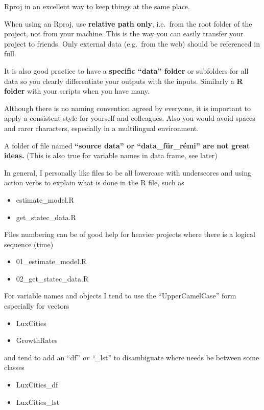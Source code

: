 \documentclass[
  letterpaper,
  DIV=11,
  numbers=noendperiod]{scrreprt}
\providecommand{\tightlist}{%
  \setlength{\itemsep}{0pt}\setlength{\parskip}{0pt}}\usepackage{longtable,booktabs,array}
\begin{document}
Rproj in an excellent way to keep things at the same place.

When using an Rproj, use \textbf{relative path only}, i.e.~from the root
folder of the project, not from your machine. This is the way you can
easily transfer your project to friends. Only external data (e.g.~from
the web) should be referenced in full.

It is also good practice to have a \textbf{specific ``data'' folder} or
subfolders for all data so you clearly differentiate your outputs with
the inputs. Similarly a \textbf{R folder} with your scripts when you
have many.

Although there is no naming convention agreed by everyone, it is
important to apply a consistent style for yourself and colleagues. Also
you would avoid spaces and rarer characters, especially in a
multilingual environment.

A folder of file named \textbf{``source data'' or ``data\_für\_rémi''
are not great ideas.} (This is also true for variable names in data
frame, see later)

In general, I personally like files to be all lowercase with underscores
and using action verbs to explain what is done in the R file, such as

\begin{itemize}
\tightlist
\item
  estimate\_model.R
\item
  get\_statec\_data.R
\end{itemize}

Files numbering can be of good help for heavier projects where there is
a logical sequence (time)

\begin{itemize}
\item
  01\_estimate\_model.R
\item
  02\_get\_statec\_data.R
\end{itemize}

For variable names and objects I tend to use the ``UpperCamelCase'' form
especially for vectors

\begin{itemize}
\item
  LuxCities
\item
  GrowthRates
\end{itemize}

and tend to add an ``df'' \emph{or ``\_}lst'' to disambiguate where
needs be between some classes

\begin{itemize}
\item
  LuxCities\_df
\item
  LuxCities\_lst
\end{itemize}
\end{document}
